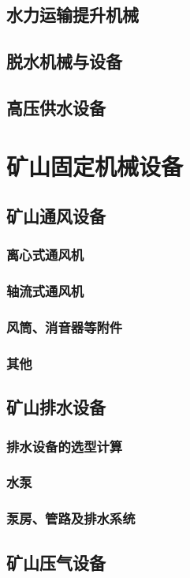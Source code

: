 \documentclass[UTF8]{../../ApplicationUniverse}
\begin{document}
    \subsection{水力运输提升机械}
    \subsection{脱水机械与设备}
    \subsection{高压供水设备}
\section{矿山固定机械设备}
    \subsection{矿山通风设备}
        \subsubsection{离心式通风机}
        \subsubsection{轴流式通风机}
        \subsubsection{风筒、消音器等附件}
        \subsubsection{其他}
    \subsection{矿山排水设备}
        \subsubsection{排水设备的选型计算}
        \subsubsection{水泵}
        \subsubsection{泵房、管路及排水系统}
    \subsection{矿山压气设备}
\end{document}
